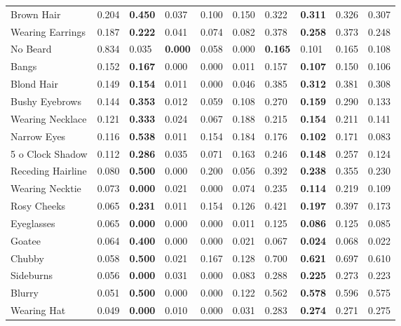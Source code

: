 \begin{tabular}{lrllrrllrr}
 Brown Hair          & 0.204 & \bf 0.450 & 0.037     & 0.100 & 0.150 & 0.322     & \bf 0.311 & 0.326 & 0.307 \\
 Wearing Earrings    & 0.187 & \bf 0.222 & 0.041     & 0.074 & 0.082 & 0.378     & \bf 0.258 & 0.373 & 0.248 \\
 No Beard            & 0.834 & 0.035     & \bf 0.000 & 0.058 & 0.000 & \bf 0.165 & 0.101     & 0.165 & 0.108 \\
 Bangs               & 0.152 & \bf 0.167 & 0.000     & 0.000 & 0.011 & 0.157     & \bf 0.107 & 0.150 & 0.106 \\
 Blond Hair          & 0.149 & \bf 0.154 & 0.011     & 0.000 & 0.046 & 0.385     & \bf 0.312 & 0.381 & 0.308 \\
 Bushy Eyebrows      & 0.144 & \bf 0.353 & 0.012     & 0.059 & 0.108 & 0.270     & \bf 0.159 & 0.290 & 0.133 \\
 Wearing Necklace    & 0.121 & \bf 0.333 & 0.024     & 0.067 & 0.188 & 0.215     & \bf 0.154 & 0.211 & 0.141 \\
 Narrow Eyes         & 0.116 & \bf 0.538 & 0.011     & 0.154 & 0.184 & 0.176     & \bf 0.102 & 0.171 & 0.083 \\
 5 o Clock Shadow    & 0.112 & \bf 0.286 & 0.035     & 0.071 & 0.163 & 0.246     & \bf 0.148 & 0.257 & 0.124 \\
 Receding Hairline   & 0.080 & \bf 0.500 & 0.000     & 0.200 & 0.056 & 0.392     & \bf 0.238 & 0.355 & 0.230 \\
 Wearing Necktie     & 0.073 & \bf 0.000 & 0.021     & 0.000 & 0.074 & 0.235     & \bf 0.114 & 0.219 & 0.109 \\
 Rosy Cheeks         & 0.065 & \bf 0.231 & 0.011     & 0.154 & 0.126 & 0.421     & \bf 0.197 & 0.397 & 0.173 \\
 Eyeglasses          & 0.065 & \bf 0.000 & 0.000     & 0.000 & 0.011 & 0.125     & \bf 0.086 & 0.125 & 0.085 \\
 Goatee              & 0.064 & \bf 0.400 & 0.000     & 0.000 & 0.021 & 0.067     & \bf 0.024 & 0.068 & 0.022 \\
 Chubby              & 0.058 & \bf 0.500 & 0.021     & 0.167 & 0.128 & 0.700     & \bf 0.621 & 0.697 & 0.610 \\
 Sideburns           & 0.056 & \bf 0.000 & 0.031     & 0.000 & 0.083 & 0.288     & \bf 0.225 & 0.273 & 0.223 \\
 Blurry              & 0.051 & \bf 0.500 & 0.000     & 0.000 & 0.122 & 0.562     & \bf 0.578 & 0.596 & 0.575 \\
 Wearing Hat         & 0.049 & \bf 0.000 & 0.010     & 0.000 & 0.031 & 0.283     & \bf 0.274 & 0.271 & 0.275 \\

\end{tabular}
